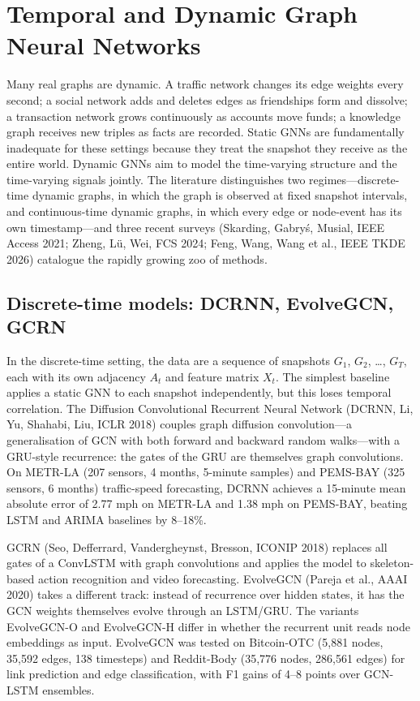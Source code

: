 \documentclass{article}
\begin{document}
\section{Temporal and Dynamic Graph Neural Networks}\label{sec:temporal-and-dynamic-graph-neural-networks}
Many real graphs are dynamic. A traffic network changes its edge weights every second; a social network adds and deletes edges as friendships form and dissolve; a transaction network grows continuously as accounts move funds; a knowledge graph receives new triples as facts are recorded. Static GNNs are fundamentally inadequate for these settings because they treat the snapshot they receive as the entire world. Dynamic GNNs aim to model the time-varying structure and the time-varying signals jointly. The literature distinguishes two regimes---discrete-time dynamic graphs, in which the graph is observed at fixed snapshot intervals, and continuous-time dynamic graphs, in which every edge or node-event has its own timestamp---and three recent surveys (Skarding, Gabryś, Musial, IEEE Access 2021; Zheng, Lü, Wei, FCS 2024; Feng, Wang, Wang et al., IEEE TKDE 2026) catalogue the rapidly growing zoo of methods.

\subsection{Discrete-time models: DCRNN, EvolveGCN, GCRN}\label{discrete-time-models-dcrnn-evolvegcn-gcrn}

In the discrete-time setting, the data are a sequence of snapshots \(G_1\), \(G_2\), \ldots, \(G_T\), each with its own adjacency \(A_t\) and feature matrix \(X_t\). The simplest baseline applies a static GNN to each snapshot independently, but this loses temporal correlation. The Diffusion Convolutional Recurrent Neural Network (DCRNN, Li, Yu, Shahabi, Liu, ICLR 2018) couples graph diffusion convolution---a generalisation of GCN with both forward and backward random walks---with a GRU-style recurrence: the gates of the GRU are themselves graph convolutions. On METR-LA (207 sensors, 4 months, 5-minute samples) and PEMS-BAY (325 sensors, 6 months) traffic-speed forecasting, DCRNN achieves a 15-minute mean absolute error of 2.77 mph on METR-LA and 1.38 mph on PEMS-BAY, beating LSTM and ARIMA baselines by 8--18\%.

GCRN (Seo, Defferrard, Vandergheynst, Bresson, ICONIP 2018) replaces all gates of a ConvLSTM with graph convolutions and applies the model to skeleton-based action recognition and video forecasting. EvolveGCN (Pareja et al., AAAI 2020) takes a different track: instead of recurrence over hidden states, it has the GCN weights themselves evolve through an LSTM/GRU. The variants EvolveGCN-O and EvolveGCN-H differ in whether the recurrent unit reads node embeddings as input. EvolveGCN was tested on Bitcoin-OTC (5,881 nodes, 35,592 edges, 138 timesteps) and Reddit-Body (35,776 nodes, 286,561 edges) for link prediction and edge classification, with F1 gains of 4--8 points over GCN-LSTM ensembles.
\end{document}
